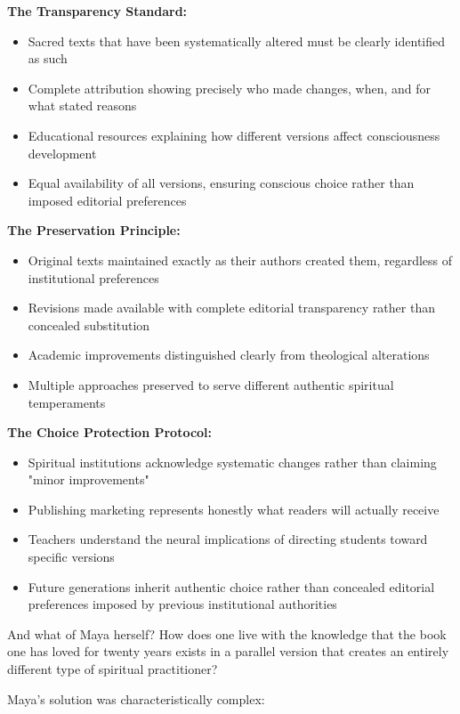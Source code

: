 \documentclass[12pt,twoside]{book}
\begin{document}
\textbf{\textbf{The Transparency Standard:}}
\begin{itemize}
\item Sacred texts that have been systematically altered must be clearly identified as such
\item Complete attribution showing precisely who made changes, when, and for what stated reasons
\item Educational resources explaining how different versions affect consciousness development
\item Equal availability of all versions, ensuring conscious choice rather than imposed editorial preferences
\end{itemize}

\textbf{\textbf{The Preservation Principle:}}
\begin{itemize}
\item Original texts maintained exactly as their authors created them, regardless of institutional preferences
\item Revisions made available with complete editorial transparency rather than concealed substitution
\item Academic improvements distinguished clearly from theological alterations
\item Multiple approaches preserved to serve different authentic spiritual temperaments
\end{itemize}

\textbf{\textbf{The Choice Protection Protocol:}}
\begin{itemize}
\item Spiritual institutions acknowledge systematic changes rather than claiming "minor improvements"
\item Publishing marketing represents honestly what readers will actually receive
\item Teachers understand the neural implications of directing students toward specific versions
\item Future generations inherit authentic choice rather than concealed editorial preferences imposed by previous institutional authorities
\end{itemize}

And what of Maya herself? How does one live with the knowledge that the book one has loved for twenty years exists in a parallel version that creates an entirely different type of spiritual practitioner?

Maya's solution was characteristically complex:
\end{document}
